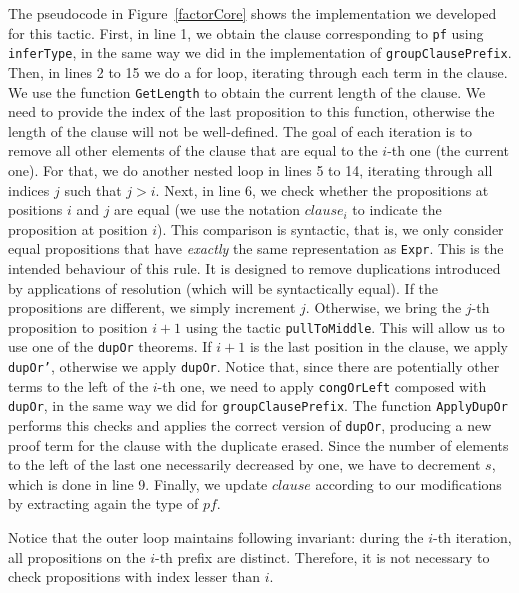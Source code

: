 The pseudocode in Figure~\ref{factorCore} shows the implementation we developed for this tactic.
First, in line 1, we obtain the clause corresponding to \texttt{pf} using \texttt{inferType},
in the same way we did in the implementation of \texttt{groupClausePrefix}. Then, in lines 2
to 15 we do a for loop, iterating through each term in the clause.
We use the function \texttt{GetLength} to obtain the current length of the clause. We need to
provide the index of the last proposition to this function, otherwise the length of the clause
will not be well-defined.
The goal of each iteration is to remove all other elements of the clause that are equal to
the $i$-th one (the current one). For that, we do another nested loop in lines 5 to 14,
iterating through all indices $j$ such that $j > i$. Next, in line 6, we check whether
the propositions at positions $i$ and $j$ are equal (we use the notation $clause_{i}$ to
indicate the proposition at position $i$). This comparison is syntactic, that is, we
only consider equal propositions that have \textit{exactly} the same representation
as \texttt{Expr}. This is the intended behaviour of this rule. It is designed to
remove duplications introduced by applications of resolution (which will be syntactically equal).
If the propositions are different, we simply increment $j$. Otherwise,
we bring the $j$-th proposition to position $i + 1$ using the tactic \texttt{pullToMiddle}.
This will allow us to use one of the \texttt{dupOr} theorems. If $i + 1$ is the last
position in the clause, we apply \texttt{dupOr'}, otherwise we apply \texttt{dupOr}.
Notice that, since there are potentially other terms to the left of the $i$-th one,
we need to apply \texttt{congOrLeft} composed with \texttt{dupOr}, in the same way we
did for \texttt{groupClausePrefix}. The function \texttt{ApplyDupOr} performs this checks
and applies the correct version of \texttt{dupOr}, producing a new proof term for the clause
with the duplicate erased. Since the number of elements to the left
of the last one necessarily decreased by one, we have to decrement $s$,
which is done in line 9. Finally, we update $clause$
according to our modifications by extracting again the type of $pf$.

Notice that the outer loop maintains following invariant: during the $i$-th iteration,
all propositions on the $i$-th prefix are distinct. Therefore, it is not necessary to
check propositions with index lesser than $i$.

